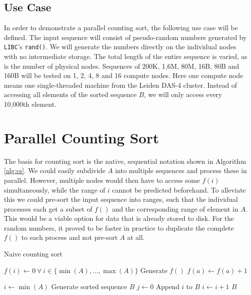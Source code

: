 \documentclass[10pt,a4paper]{article}
\begin{document}
\subsection{Use Case}

In order to demonstrate a parallel counting sort, the following use case will be defined. The input sequence will consist of pseudo-random numbers generated by \texttt{LIBC}'s \texttt{rand()}. We will generate the numbers directly on the individual nodes with no intermediate storage. The total length of the entire sequence is varied, as is the number of physical nodes. Sequences of 200K, 1,6M, 80M, 16B, 80B and 160B will be tested on 1, 2, 4, 8 and 16 compute nodes. Here one compute node means one single-threaded machine from the Leiden DAS-4 cluster. Instead of accessing all elements of the sorted sequence $B$, we will only access every 10,000th element.

\section{Parallel Counting Sort}

The basis for counting sort is the native, sequential notation shown in Algorithm \ref{alg:cs}. We could easily subdivide $A$ into multiple sequences and process these in parallel. However, multiple nodes would then have to access some $f(i)$ simultaneously, while the range of $i$ cannot be predicted beforehand. To alleviate this we could pre-sort the input sequence into ranges, such that the individual processes each get a subset of $f()$ and the corresponding range of element in $A$. This would be a viable option for data that is already stored to disk. For the random numbers, it proved to be faster in practice to duplicate the complete $f()$ to each process and not pre-sort $A$ at all.

\begin{algorithm}
\caption{Naive counting sort}
\label{alg:cs}
\begin{algorithmic}
\State $f(i) \gets 0 \ \forall \ i \in \{\min(A),\dots,\max(A)\}$
\Comment Generate $f()$
	\State $f(a) \gets f(a) + 1$ 
\EndFor
			
\State $i \gets \min(A)$
	\Comment Generate sorted sequence $B$
	\State $j \gets 0$
		\State Append $i$ to $B$
	\EndWhile
	\State $i \gets i + 1$
\EndWhile
\Return $B$
\EndFunction
\end{algorithmic}
\end{algorithm} 
\end{document}
